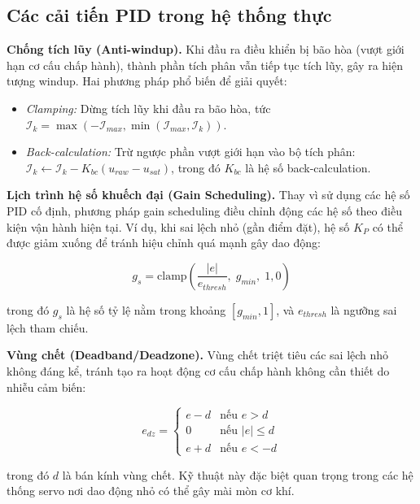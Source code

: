 \subsection{Các cải tiến PID trong hệ thống thực}

\textbf{Chống tích lũy (Anti-windup).}
Khi đầu ra điều khiển bị bão hòa (vượt giới hạn cơ cấu chấp hành), thành phần tích phân vẫn tiếp tục tích lũy, gây ra hiện tượng windup. Hai phương pháp phổ biến để giải quyết:

\begin{itemize}
    \item \textit{Clamping:} Dừng tích lũy khi đầu ra bão hòa, tức $\mathcal{I}_{k} = \max(-\mathcal{I}_{max}, \min(\mathcal{I}_{max}, \mathcal{I}_{k}))$.
    \item \textit{Back-calculation:} Trừ ngược phần vượt giới hạn vào bộ tích phân: $\mathcal{I}_{k} \leftarrow \mathcal{I}_{k} - K_{bc}(u_{raw} - u_{sat})$, trong đó $K_{bc}$ là hệ số back-calculation.
\end{itemize}

\textbf{Lịch trình hệ số khuếch đại (Gain Scheduling).}
Thay vì sử dụng các hệ số PID cố định, phương pháp gain scheduling điều chỉnh động các hệ số theo điều kiện vận hành hiện tại. Ví dụ, khi sai lệch nhỏ (gần điểm đặt), hệ số $K_P$ có thể được giảm xuống để tránh hiệu chỉnh quá mạnh gây dao động:

\begin{equation}
    g_s = \text{clamp}\left(\frac{|e|}{e_{thresh}},\; g_{min},\; 1{,}0\right)
\end{equation}

trong đó $g_s$ là hệ số tỷ lệ nằm trong khoảng $[g_{min}, 1]$, và $e_{thresh}$ là ngưỡng sai lệch tham chiếu.

\textbf{Vùng chết (Deadband/Deadzone).}
Vùng chết triệt tiêu các sai lệch nhỏ không đáng kể, tránh tạo ra hoạt động cơ cấu chấp hành không cần thiết do nhiễu cảm biến:

\begin{equation}
    e_{dz} = \begin{cases}
        e - d & \text{nếu } e > d \\
        0 & \text{nếu } |e| \leq d \\
        e + d & \text{nếu } e < -d
    \end{cases}
\end{equation}

trong đó $d$ là bán kính vùng chết. Kỹ thuật này đặc biệt quan trọng trong các hệ thống servo nơi dao động nhỏ có thể gây mài mòn cơ khí.

